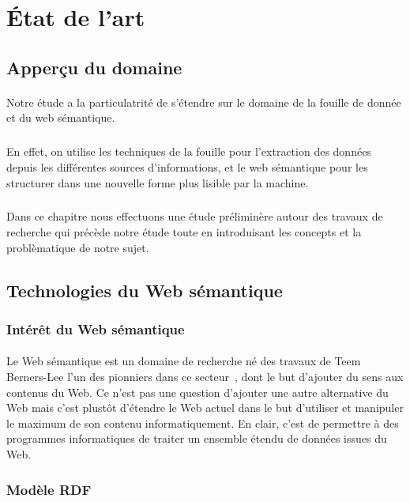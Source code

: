 \documentclass[12pt,a4	]{report}
\begin{document}
 
\section*{État de l'art}
\subsection*{Apperçu du domaine}
\paragraph{}
Notre étude a la particulatrité de s'étendre sur le domaine de la fouille de donnée et du web sémantique.
\subparagraph{}
En effet, on utilise les techniques de la fouille pour l'extraction des données depuis les différentes sources d'informations, et le web sémantique pour les structurer dans une nouvelle forme plus lisible par la machine.
\subparagraph{}
Dans ce chapitre nous effectuons une étude préliminère autour des travaux de recherche qui précède notre étude toute en introduisant les concepts et la problèmatique de notre sujet.
\subsection*{Technologies du Web sémantique}
\subsubsection*{Intérêt du Web sémantique}
\paragraph{}
Le Web sémantique est un domaine de recherche né des travaux de Teem Berners-Lee l'un des pionniers dans ce secteur~\cite{Berners-lee2001}, dont le but d'ajouter du sens aux contenus du Web. Ce n'est pas une question d'ajouter une autre alternative du Web mais c'est plustôt d'étendre le Web actuel dans le but d'utiliser et manipuler le maximum de son contenu informatiquement. En clair, c'est de permettre à des programmes informatiques de traiter un ensemble étendu de données issues du Web.
\subsubsection*{Modèle RDF}
\end{document}
